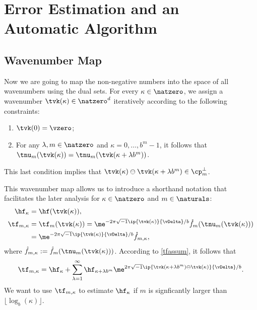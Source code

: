 \documentclass[]{elsarticle}
\theoremstyle{definition}
\renewcommand{\bbK}{\natzero^d}
\newcommand{\rf}{\mathring{f}}
\begin{document}
\section{Error Estimation and an Automatic Algorithm}

\subsection{Wavenumber Map}

Now we are going to map the non-negative numbers into the space of all wavenumbers using the dual sets.  For every $\kappa \in \natzero$, we assign a wavenumber $\tvk(\kappa) \in \bbK$ iteratively according to the following constraints: 
\begin{enumerate}
\renewcommand{\labelenumi}{\roman{enumi})}

\item $\tvk(0)= \vzero$;

\item For any $\lambda, m \in \natzero$ and $\kappa=0, \ldots, b^m-1$, it follows that  $\tnu_m(\tvk(\kappa))=\tnu_m(\tvk(\kappa+\lambda b^m))$.

\end{enumerate}
This last condition implies that $\tvk(\kappa) \ominus \tvk(\kappa+\lambda b^m) \in \cp_m^{\perp}$.

This wavenumber map allows us to introduce a shorthand notation that facilitates the later analysis for $\kappa \in \natzero$ and $m \in \naturals$:
\begin{align*}
\hf_{\kappa} & =\hf(\tvk(\kappa)), \\
\tf_{m,\kappa}& = \tf_m(\tvk(\kappa))= \me^{-2 \pi \sqrt{-1} \ip{\tvk(\kappa)}{\vDelta}/b} \rf_m(\tnu_m(\tvk(\kappa)))\\
&= \me^{-2 \pi \sqrt{-1} \ip{\tvk(\kappa)}{\vDelta}/b} \rf_{m,\kappa},
\end{align*}
where $\rf_{m,\kappa}:=\rf_m(\tnu_m(\tvk(\kappa)))$. According to \eqref{tfassum}, it follows that 
\begin{equation}
\tf_{m,\kappa} = \hf_{\kappa} + \sum_{\lambda=1}^{\infty} \hf_{\kappa+\lambda b^{m}} \me^{2 \pi \sqrt{-1} \ip{\tvk(\kappa+\lambda b^{m}) \ominus \tvk(\kappa)}{\vDelta}/b}.
\label{tfassumc}
\end{equation}
We want to use $\tf_{m,\kappa}$ to estimate $\hf_{\kappa}$ if $m$ is signficantly larger than $\lfloor \log_b(\kappa) \rfloor$.
\end{document}
